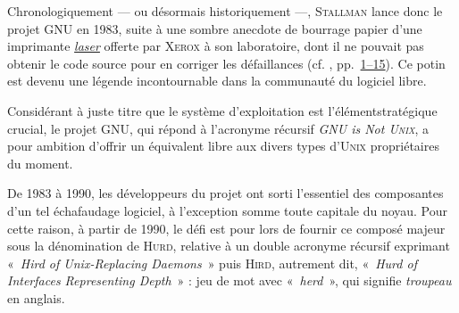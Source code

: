 %
Chronologiquement --- ou désormais historiquement ---, \textsc{Stallman} lance donc le projet \gls{GNU} en 1983, suite à une sombre anecdote de bourrage papier d'une imprimante \href{https://fr.wikipedia.org/wiki/Laser}{\textit{laser}} offerte par \textsc{Xerox} à son laboratoire,  dont il ne pouvait pas obtenir le code source pour en corriger les défaillances (cf. \parencite{Stallman-Williams-Massutti:2010}, pp.~\href{./Documents/Chapter01/framabook6_stallman_v1_gnu-fdl.pdf}{1--15}). Ce potin est devenu une légende incontournable dans la communauté du logiciel libre.
 
Considérant à juste titre que le système d'exploitation est l'élément\linebreak stratégique crucial, le projet GNU, qui répond à l'acronyme récursif \textit{GNU is Not \textsc{Unix}}, a pour ambition d'offrir un équivalent libre aux divers types d'\textsc{Unix} propriétaires du moment.

De 1983 à 1990, les développeurs du projet ont sorti l'essentiel des composantes d'un tel échafaudage logiciel, à l’exception somme toute capitale du noyau.
Pour cette raison, à partir de 1990, le défi est pour lors de fournir ce composé majeur sous la dénomination de \textsc{Hurd}, relative à un double acronyme récursif exprimant «~\textit{Hird of Unix-Replacing Daemons}~» puis \textsc{Hird}, autrement dit, «~\textit{Hurd of Interfaces Representing Depth}~» : jeu de mot avec «~\textit{herd}~», qui signifie \emph{troupeau} en anglais.

